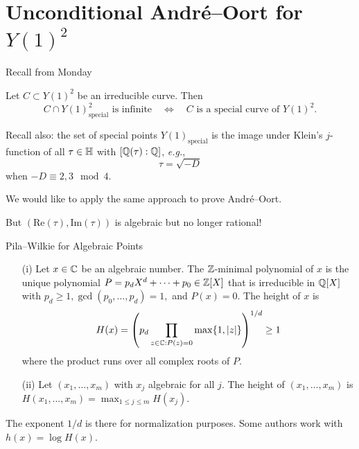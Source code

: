 \documentclass{beamer}
\begin{document}
\section{Unconditional Andr\'e--Oort for $Y(1)^2$}

\begin{frame}{Recall from Monday}
  \begin{theorem}
    Let $C\subset Y(1)^2$ be an irreducible curve. Then
    \begin{equation*}
      C \cap Y(1)^2_{\mathrm{special}}\text{ is
        infinite}\quad\Longleftrightarrow\quad \text{$C$ is a special
        curve of $Y(1)^2$}. 
    \end{equation*}  
  \end{theorem}

  Recall also: the set of special points $Y(1)_{\mathrm{special}}$
  is the image under Klein's $j$-function of all $\tau\in{\mathbb{H}}$ with
  $[{\mathbb{Q}}(\tau):{\mathbb{Q}}]$, \textit{e.g.},
  $$\tau = \sqrt{-D}$$
  when $-D\equiv 2,3 \mod 4$. 
  

  We would like to apply the same approach to prove Andr\'e--Oort.

  But $(\mathrm{Re}(\tau),\mathrm{Im}(\tau))$ is
  algebraic but \alert{no longer} rational!   
\end{frame}

\begin{frame}{Pila--Wilkie for Algebraic Points}
  \begin{definition}
    \begin{enumerate}
    \item [(i)] Let $x\in{\mathbb{C}}$ be an algebraic number. The
      ${\mathbb{Z}}$-minimal polynomial of $x$ is the
      unique polynomial $P=p_dX^d+\cdots+p_0\in {\mathbb{Z}}[X]$ that is
      irreducible in ${\mathbb{Q}}[X]$ with $p_d\ge
      1,
      \gcd(p_0,\ldots,p_d)=1,$ and $P(x)=0$. The \alert{height} of $x$
      is
      \begin{equation*}
        H(x) = \left(p_d \prod_{z\in {\mathbb{C}} : P(z)=0}
          \max\{1,|z|\}\right)^{1/d}\ge 1
      \end{equation*}
      where the product runs over all complex roots of $P$.
    \item[(ii)] Let $(x_1,\ldots,x_m)$ with $x_j$
      algebraic for all $j$. The \alert{height} of
      $(x_1,\ldots,x_m)$ is
      $H(x_1,\ldots,x_m) = \max_{1\le j\le m}H(x_j)$. 
    \end{enumerate}
  \end{definition}
  The exponent $1/d$ is there for normalization purposes. Some authors
  work with $h(x)=\log H(x)$. 
\end{frame}
\end{document}
